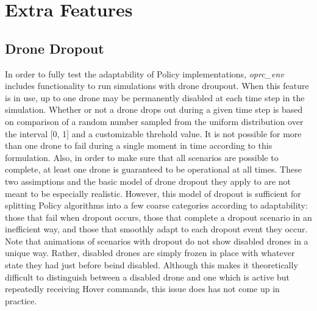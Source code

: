 \section{Extra Features}

\subsection{Drone Dropout}

In order to fully test the adaptability of Policy implementations, \textit{oprc\_env} includes functionality to run simulations with drone droupout. When this feature is in use, up to one drone may be permanently disabled at each time step in the simulation. Whether or not a drone drops out during a given time step is based on comparison of a random number sampled from the uniform distribution over the interval [0, 1] and a customizable threhold value. It is not possible for more than one drone to fail during a single moment in time according to this formulation. Also, in order to make sure that all scenarios are possible to complete, at least one drone is guaranteed to be operational at all times. These two assimptions and the basic model of drone dropout they apply to are not meant to be especially realistic. However, this model of dropout is sufficient for splitting Policy algorithms into a few coarse categories according to adaptability: those that fail when dropout occurs, those that complete a dropout scenario in an inefficient way, and those that smoothly adapt to each dropout event they occur. Note that animations of scenarios with dropout do not show disabled drones in a unique way. Rather, disabled drones are simply frozen in place with whatever state they had just before beind disabled. Although this makes it theoretically difficult to distinguish between a disabled drone and one which is active but repeatedly receiving Hover commands, this issue does has not come up in practice.

